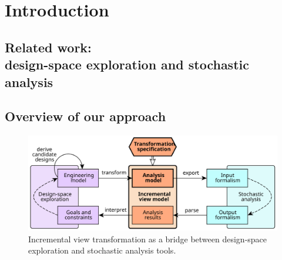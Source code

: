 \chapter{Introduction}
\label{chap:intro}


\section[Related work: design-space exploration and stochastic analysis]{Related work:\\design-space exploration and stochastic analysis}
\label{sec:intro:relwork}

\section{Overview of our approach}
\label{sec:intro:approach}

\begin{figure}
  \centering
  \includegraphics[scale=0.9]{figures/overview}
  \caption{Incremental view transformation as a bridge between design-space exploration and stochastic analysis tools.}
\end{figure}

